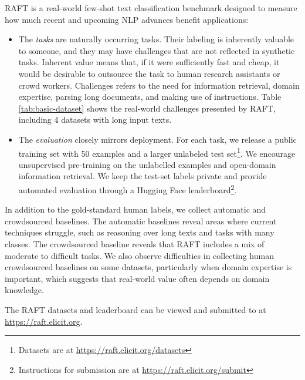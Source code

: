 \documentclass{article}
\newcommand{\name}{\textsc{RAFT}}
\newcommand{\benchmarkURL}{\href{https://raft.elicit.org}{https://raft.elicit.org}}
\newcommand{\submissionInstructionsURL}{\href{https://raft.elicit.org/submit}{https://raft.elicit.org/submit}}
\newcommand{\datasetsURL}{\href{https://raft.elicit.org/datasets}{https://raft.elicit.org/datasets}}
\begin{document}
\begin{comment}
How we're solving it
\end{comment}

\name{} is a real-world few-shot text classification benchmark designed to measure how much recent and upcoming NLP advances benefit applications:

\begin{itemize}

\item The \textit{tasks} are naturally occurring tasks. Their labeling is inherently valuable to someone, and they may have challenges that are not reflected in synthetic tasks. Inherent value means that, if it were sufficiently fast and cheap, it would be desirable to outsource the task to human research assistants or crowd workers. Challenges refers to the need for information retrieval, domain expertise, parsing long documents, and making use of instructions. Table \ref{tab:basic-dataset} shows the real-world challenges presented by \name{}, including 4 datasets with long input texts.

\item The \textit{evaluation} closely mirrors deployment. For each task, we release a public training set with 50 examples and a larger unlabeled test set\footnote{Datasets are at \datasetsURL{}}. We encourage unsupervised pre-training on the unlabelled examples and open-domain information retrieval. We keep the test-set labels private and provide automated evaluation through a Hugging Face leaderboard\footnote{Instructions for submission are at \submissionInstructionsURL}.

\end{itemize}

\begin{comment}
Evidence that our solution is good
\end{comment}

In addition to the gold-standard human labels, we collect automatic and crowdsourced baselines. The automatic baselines reveal areas where current techniques struggle, such as reasoning over long texts and tasks with many classes. The crowdsourced baseline reveals that \name{} includes a mix of moderate to difficult tasks. We also observe difficulties in collecting human crowdsourced baselines on some datasets, particularly when domain expertise is important, which suggests that real-world value often depends on domain knowledge.

The \name{} datasets and leaderboard can be viewed and submitted to at \benchmarkURL{}.
\end{document}

